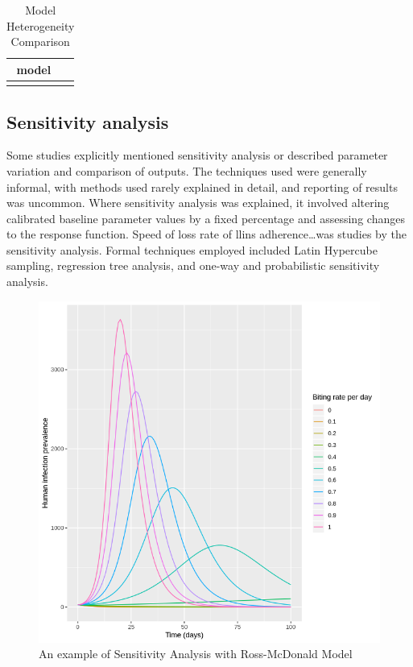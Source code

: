 \documentclass[a4paper, 12pt, twoside]{article}
\begin{document}
\begin{table}[htpb]
	\centering
	\caption{Model Heterogeneity Comparison}
	\label{tab:model_heterogeneity_comparison}
	\begin{tabular}{cc}
		\toprule
		model             & \\
		\midrule
		\cite{White2018b} & \\
		\bottomrule
	\end{tabular}
\end{table}

\subsection{Sensitivity analysis}%
\label{par:sensitivity_analysis}
Some studies\cite{Mohammed-Awel2019, White2018b} explicitly mentioned sensitivity analysis or described parameter variation and comparison of outputs.
The techniques used were generally informal, with methods used rarely explained in detail, and reporting of results was uncommon.
Where sensitivity analysis was explained, it involved altering calibrated baseline parameter values by a fixed percentage and assessing changes to the response function.
Speed of loss rate of \gls{llins} adherence\cite{White2018b}\ldots was studies by the sensitivity analysis.
Formal techniques employed included Latin Hypercube sampling, regression tree analysis, and one-way and probabilistic sensitivity analysis.

\begin{figure}[htpb]
  \centering
  \includegraphics[width=\textwidth]{ross-mcdonald-sensitivity}
  \caption{An example of Sensitivity Analysis with Ross-McDonald Model}
  \label{fig:ross-mcdonald-sensitivity}
\end{figure}
\end{document}

